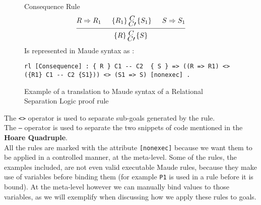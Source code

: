\documentclass[12pt,a4paper]{article}
\newcommand{\hq}[4]{
	\left\{{#1}\right\}
	\let\scriptstyle\textstyle 
	\substack{{#2} \\ 	\let\scriptstyle\textstyle {#3}} 
	\left\{{#4}\right\}
}
\begin{document}
\begin{figure}[h]
	Consequence Rule
	\[
	\begin{prooftree}
	\Hypo{R \Rightarrow R_1}
	\Hypo{\hq{R_1}{C}{C\prime}{S_1}}
	\Hypo{S \Rightarrow S_1}
	\Infer 3 {\hq{R}{C}{C\prime}{S}}
	\end{prooftree}	
	\]
	Is represented in Maude syntax as : 
	\begin{lstlisting}[caption=Relational Separation Logic Consequence rule]
	rl [Consequence] : { R } C1 -- C2  { S } => ((R => R1) <> ({R1} C1 -- C2 {S1})) <> (S1 => S) [nonexec] .
	\end{lstlisting}
	\caption{Example of a translation to Maude syntax of a Relational Separation Logic proof rule}
	\label{fig:RSLTranslation}
\end{figure}
The \texttt{<>} operator is used to separate sub-goals generated by the rule.
\\

The \texttt{---} operator is used to separate the two snippets of code mentioned in the \textbf{Hoare Quadruple}.
\\

All the rules are marked with the attribute \texttt{[nonexec]} because we want them to be applied in a controlled manner, at the meta-level. Some of the rules, the examples included, are not even valid executable Maude rules, because they make use of variables before binding them (for example \texttt{P1} is used in a rule before it is bound). At the meta-level however we can manually bind values to those variables, as we will exemplify when discussing how we apply these rules to goals.
\end{document}
